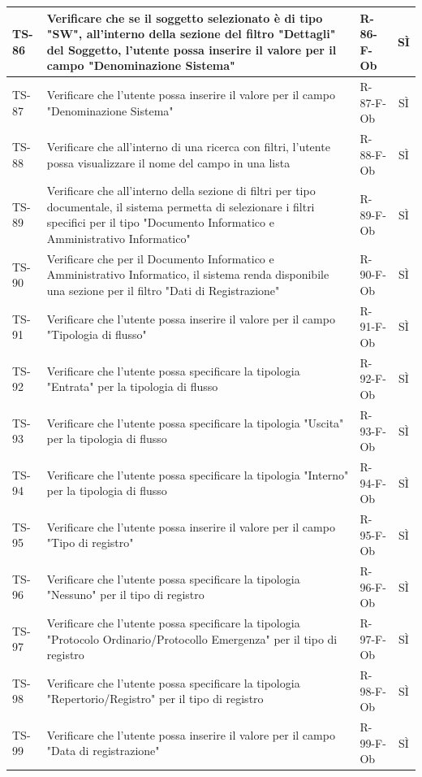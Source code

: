 \documentclass[a4paper,12pt]{article}
\begin{document}
\begin{longtable}{|p{1.5cm}|p{8.3cm}|p{2.4cm}|c|}
\hline
TS-86 & Verificare che se il soggetto selezionato è di tipo "SW", all'interno della sezione del filtro "Dettagli" del Soggetto, l'utente possa inserire il valore per il campo "Denominazione Sistema" & R-86-F-Ob & SÌ \\
\hline
TS-87 & Verificare che l'utente possa inserire il valore per il campo "Denominazione Sistema" & R-87-F-Ob & SÌ \\
\hline
TS-88 & Verificare che all'interno di una ricerca con filtri, l'utente possa visualizzare il nome del campo in una lista & R-88-F-Ob & SÌ \\
\hline
TS-89 & Verificare che all'interno della sezione di filtri per tipo documentale, il sistema permetta di selezionare i filtri specifici per il tipo "Documento Informatico e Amministrativo Informatico" & R-89-F-Ob & SÌ \\
\hline
TS-90 & Verificare che per il Documento Informatico e Amministrativo Informatico, il sistema renda disponibile una sezione per il filtro "Dati di Registrazione" & R-90-F-Ob & SÌ \\
\hline
TS-91 & Verificare che l'utente possa inserire il valore per il campo "Tipologia di flusso" & R-91-F-Ob & SÌ \\
\hline
TS-92 & Verificare che l'utente possa specificare la tipologia "Entrata" per la tipologia di flusso & R-92-F-Ob & SÌ \\
\hline
TS-93 & Verificare che l'utente possa specificare la tipologia "Uscita" per la tipologia di flusso & R-93-F-Ob & SÌ \\
\hline
TS-94 & Verificare che l'utente possa specificare la tipologia "Interno" per la tipologia di flusso & R-94-F-Ob & SÌ \\
\hline
TS-95 & Verificare che l'utente possa inserire il valore per il campo "Tipo di registro" & R-95-F-Ob & SÌ \\
\hline
TS-96 & Verificare che l'utente possa specificare la tipologia "Nessuno" per il tipo di registro & R-96-F-Ob & SÌ \\
\hline
TS-97 & Verificare che l'utente possa specificare la tipologia "Protocolo Ordinario/Protocollo Emergenza" per il tipo di registro & R-97-F-Ob & SÌ \\
\hline
TS-98 & Verificare che l'utente possa specificare la tipologia "Repertorio/Registro" per il tipo di registro & R-98-F-Ob & SÌ \\
\hline
TS-99 & Verificare che l'utente possa inserire il valore per il campo "Data di registrazione" & R-99-F-Ob & SÌ \\

\end{longtable}
\end{document}
